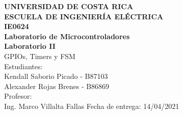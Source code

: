 \documentclass[12pt,letterpaper]{article}
\begin{document}
\begin{titlepage}
\begin{center}
\textbf{UNIVERSIDAD DE COSTA RICA}\\ 
\vspace{6mm}
\textbf{ESCUELA DE INGENIERÍA ELÉCTRICA}\\
\vspace{3cm}
\textbf{IE0624}\\
\textbf{Laboratorio de Microcontroladores}\\
\vspace{3cm}
\textbf{Laboratorio II}\\
\vspace{0.5cm}
GPIOs, Timers y FSM\\
\vspace{3cm}
Estudiantes:\\
Kendall Saborio Picado - B87103\\
Alexander Rojas Brenes - B86869\\
\vspace{1.5cm}
Profesor:\\
Ing. Marco Villalta Fallas
\vfill
Fecha de entrega: 14/04/2021
\end{center}
\end{titlepage}

\tableofcontents












\end{document}
